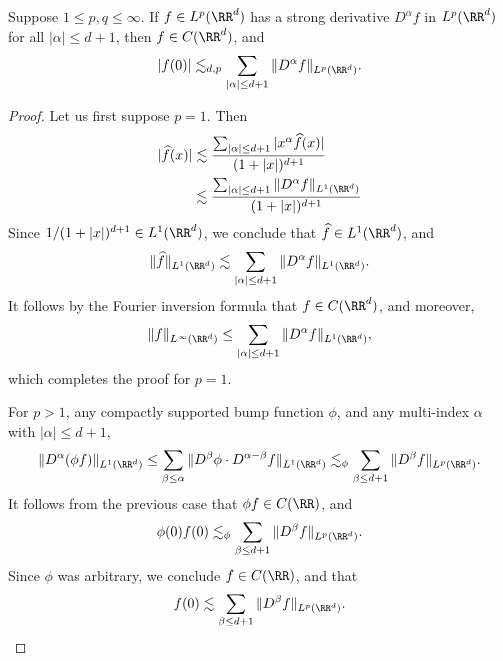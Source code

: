 \begin{lemma}
  Suppose $1 \leq p,q \leq \infty$. If $f \in L^p(\RR^d)$ has a strong derivative $D^\alpha f$ in $L^p(\RR^d)$ for all $|\alpha| \leq d+1$, then $f \in C(\RR^d)$, and
    \[ |f(0)| \lesssim_{d,p} \sum_{|\alpha| \leq d + 1} \| D^\alpha f \|_{L^p(\RR^d)}. \]
\end{lemma}
\begin{proof}
    Let us first suppose $p = 1$. Then
    \begin{align*}
      |\widehat{f}(x)| &\lesssim \frac{\sum_{|\alpha| \leq d+1} |x^\alpha \widehat{f}(x)|}{(1 + |x|)^{d+1}}\\
      &\lesssim \frac{\sum_{|\alpha| \leq d+1} \| D^\alpha f \|_{L^1(\RR^d)}}{(1 + |x|)^{d+1}}
    \end{align*}
    Since $1/(1 + |x|)^{d+1} \in L^1(\RR^d)$, we conclude that $\widehat{f} \in L^1(\RR^d)$, and
    \[ \| \widehat{f} \|_{L^1(\RR^d)} \lesssim \sum_{|\alpha| \leq d+1} \| D^\alpha f \|_{L^1(\RR^d)}. \]
    It follows by the Fourier inversion formula that $f \in C(\RR^d)$, and moreover,
    \[ \| f \|_{L^\infty(\RR^d)} \leq \sum_{|\alpha| \leq d+1} \| D^\alpha f \|_{L^1(\RR^d)}, \]
    which completes the proof for $p = 1$.

    For $p > 1$, any compactly supported bump function $\phi$, and any multi-index $\alpha$ with $|\alpha| \leq d+1$,
    \[ \| D^\alpha(\phi f) \|_{L^1(\RR^d)} \leq \sum_{\beta \leq \alpha} \| D^\beta \phi \cdot D^{\alpha - \beta} f \|_{L^1(\RR^d)} \lesssim_\phi \sum_{\beta \leq d+1} \| D^\beta f \|_{L^p(\RR^d)}. \]
    It follows from the previous case that $\phi f \in C(\RR)$, and
    \[ \phi(0) f(0) \lesssim_\phi \sum_{\beta \leq d+1} \| D^\beta f \|_{L^p(\RR^d)}. \]
    Since $\phi$ was arbitrary, we conclude $f \in C(\RR)$, and that
    \[ f(0) \lesssim \sum_{\beta \leq d+1} \| D^\beta f \|_{L^p(\RR^d)}. \qedhere \]
\end{proof}

